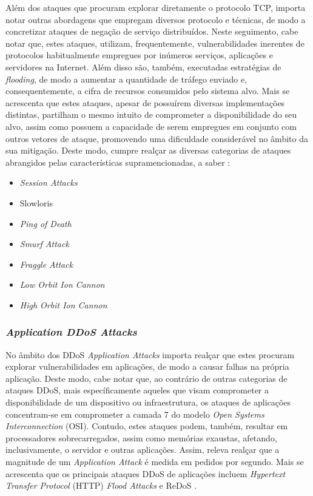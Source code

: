 Além dos ataques que procuram explorar diretamente o protocolo TCP, importa notar outras abordagens que empregam diversos protocolo e técnicas, de modo a concretizar ataques de negação de serviço distribuídos. Neste seguimento, cabe notar que, estes ataques, utilizam, frequentemente, vulnerabilidades inerentes de protocolos habitualmente empregues por inúmeros serviços, aplicações e servidores na Internet. Além disso são, também, executadas estratégias de \textit{flooding}, de modo a aumentar a quantidade de tráfego enviado e, consequentemente, a cifra de recursos consumidos pelo sistema alvo. Mais se acrescenta que estes ataques, apesar de possuírem diversas implementações distintas, partilham o mesmo intuito de comprometer a disponibilidade do seu alvo, assim como possuem a capacidade de serem empregues em conjunto com outros vetores de ataque, promovendo uma dificuldade considerável no âmbito da sua mitigação. Deste modo, cumpre realçar as diversas categorias de ataques abrangidos pelas características supramencionadas, a saber \cite{esecurityplanet_types_of_ddos_attacks,connectwise_types_of_ddos_attacks}:
\begin{itemize}
    \item \textit{Session Attacks}
    \item Slowloris
    \item \textit{Ping of Death}
    \item \textit{Smurf Attack}
    \item \textit{Fraggle Attack}
    \item \textit{Low Orbit Ion Cannon}
    \item \textit{High Orbit Ion Cannon}
\end{itemize}

\subsubsection{\textit{Application DDoS Attacks}}
No âmbito dos DDoS \textit{Application Attacks} importa realçar que estes procuram explorar vulnerabilidades em aplicações, de modo a causar falhas na própria aplicação. Deste modo, cabe notar que, ao contrário de outras categorias de ataques DDoS, mais específicamente aqueles que visam comprometer a disponibilidade de um dispositivo ou infraestrutura, os ataques de aplicações concentram-se em comprometer a camada 7 do modelo \textit{Open Systems Interconnection} (OSI). Contudo, estes ataques podem, também, resultar em processadores sobrecarregados, assim como memórias exaustas, afetando, inclusivamente, o servidor e outras aplicações. Assim, releva realçar que a magnitude de um \textit{Application Attack} é medida em pedidos por segundo. Mais se acrescenta que os principais ataques DDoS de aplicações incluem \textit{Hypertext Transfer Protocol} (HTTP) \textit{Flood Attacks} e ReDoS \cite{esecurityplanet_types_of_ddos_attacks,connectwise_types_of_ddos_attacks}.


